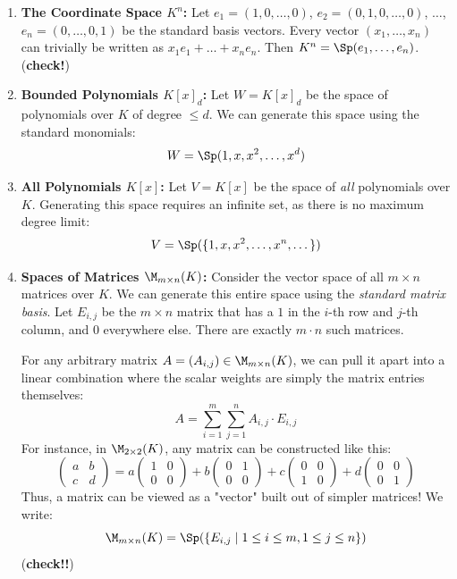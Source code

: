 \begin{enumerate}
    \item \textbf{The Coordinate Space $K^n$:} 
    Let $e_1 = (1, 0, \dots, 0)$, $e_2 = (0, 1, 0, \dots, 0)$, $\dots$, $e_n = (0, \dots, 0, 1)$ be the standard basis vectors. Every vector $(x_1, \dots, x_n)$ can trivially be written as $x_1 e_1 + \dots + x_n e_n$.
    Then $K^n = \Sp(e_1, \dots, e_n)$. (\textbf{check!})
    
    \item \textbf{Bounded Polynomials $K[x]_d$:} 
    Let $W = K[x]_d$ be the space of polynomials over $K$ of degree $\le d$. 
    We can generate this space using the standard monomials:
    \[
    W = \Sp(1, x, x^2, \dots, x^d)
    \]
    
    \item \textbf{All Polynomials $K[x]$:} 
    Let $V = K[x]$ be the space of \textit{all} polynomials over $K$. 
    Generating this space requires an infinite set, as there is no maximum degree limit:
    \[
    V = \Sp(\{1, x, x^2, \dots, x^n, \dots\})
    \]
    
    \item \textbf{Spaces of Matrices $\M_{m \times n}(K)$:} 
    Consider the vector space of all $m \times n$ matrices over $K$. We can generate this entire space using the \textit{standard matrix basis}. 
    Let $E_{i,j}$ be the $m \times n$ matrix that has a $1$ in the $i$-th row and $j$-th column, and $0$ everywhere else. There are exactly $m \cdot n$ such matrices.
    
    For any arbitrary matrix $A = (A_{i,j}) \in \M_{m \times n}(K)$, we can pull it apart into a linear combination where the scalar weights are simply the matrix entries themselves:
    \[
    A = \sum_{i=1}^m \sum_{j=1}^n A_{i,j} \cdot E_{i,j}
    \]
    For instance, in $\M_{2 \times 2}(K)$, any matrix can be constructed like this:
    \[
    \begin{pmatrix} a & b \\ c & d \end{pmatrix} = a \begin{pmatrix} 1 & 0 \\ 0 & 0 \end{pmatrix} + b \begin{pmatrix} 0 & 1 \\ 0 & 0 \end{pmatrix} + c \begin{pmatrix} 0 & 0 \\ 1 & 0 \end{pmatrix} + d \begin{pmatrix} 0 & 0 \\ 0 & 1 \end{pmatrix}
    \]
    Thus, a matrix can be viewed as a "vector" built out of simpler matrices! We write:
    \[
    \M_{m \times n}(K) = \Sp(\{E_{i,j} \mid 1 \le i \le m, 1 \le j \le n\})
    \]
    (\textbf{check!!})
\end{enumerate}